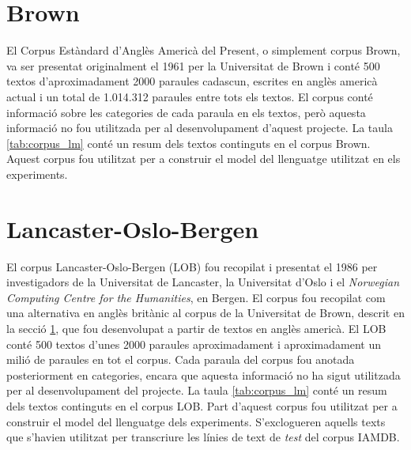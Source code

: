 \section{Brown}\label{sec:corpus_brown}
El Corpus Estàndard d'Anglès Americà del Present, o simplement corpus Brown, va ser presentat originalment el 1961\cite{francis1979brown} per la Universitat de Brown i conté 500 textos d'aproximadament 2000 paraules cadascun, escrites en anglès americà actual i un total de 1.014.312 paraules entre tots els textos. El corpus conté informació sobre les categories de cada paraula en els textos, però aquesta informació no fou utilitzada per al desenvolupament d'aquest projecte. La taula \ref{tab:corpus_lm} conté un resum dels textos continguts en el corpus Brown. Aquest corpus fou utilitzat per a construir el model del llenguatge utilitzat en els experiments.

\section{Lancaster-Oslo-Bergen}\label{sec:corpus_lob}
El corpus Lancaster-Oslo-Bergen (LOB) fou recopilat i presentat el 1986\cite{johansson1986tagged} per investigadors de la Universitat de Lancaster, la Universitat d'Oslo i el \emph{Norwegian Computing Centre for the Humanities}, en Bergen. El corpus fou recopilat com una alternativa en anglès britànic al corpus de la Universitat de Brown, descrit en la secció \ref{sec:corpus_brown}, que fou desenvolupat a partir de textos en anglès americà. El LOB conté 500 textos d'unes 2000 paraules aproximadament i aproximadament un milió de paraules en tot el corpus. Cada paraula del corpus fou anotada posteriorment en categories, encara que aquesta informació no ha sigut utilitzada per al desenvolupament del projecte. La taula \ref{tab:corpus_lm} conté un resum dels textos continguts en el corpus LOB. Part d'aquest corpus fou utilitzat per a construir el model del llenguatge dels experiments. S'exclogueren aquells texts que s'havien utilitzat per transcriure les línies de text de \emph{test} del corpus IAMDB.

